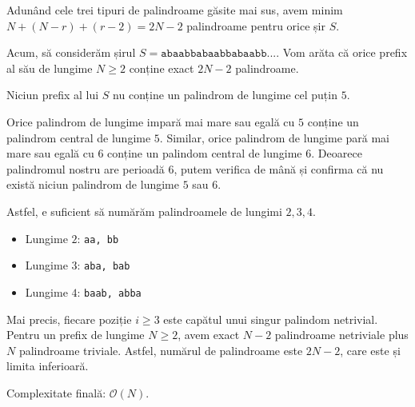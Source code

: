 Adunând cele trei tipuri de palindroame găsite mai sus, avem minim $N + (N - r) + (r - 2) = 2N - 2$ palindroame pentru orice șir $S$.

\medskip

Acum, să considerăm șirul $S = \texttt{abaabbabaabbabaabb...}$. Vom arăta că orice prefix al său de lungime $N \geq 2$ conține exact $2N - 2$ palindroame.

\begin{remark}
    Niciun prefix al lui $S$ nu conține un palindrom de lungime cel puțin $5$.
\end{remark}

Orice palindrom de lungime impară mai mare sau egală cu $5$ conține un palindrom central de lungime $5$. Similar, orice palindrom de lungime pară mai mare sau egală cu $6$ conține un palindom central de lungime $6$. Deoarece palindromul nostru are perioadă $6$, putem verifica de mână și confirma că nu există niciun palindrom de lungime $5$ sau $6$.

Astfel, e suficient să numărăm palindroamele de lungimi $2, 3, 4$.
\begin{itemize}
    \item Lungime $2$: \texttt{aa, bb}
    \item Lungime $3$: \texttt{aba, bab}
    \item Lungime $4$: \texttt{baab, abba}
\end{itemize}

Mai precis, fiecare poziție $i \geq 3$ este capătul unui singur palindom netrivial. Pentru un prefix de lungime $N \geq 2$, avem exact $N - 2$ palindroame netriviale plus $N$ palindroame triviale. Astfel, numărul de palindroame este $2N - 2$, care este și limita inferioară.

\medskip

Complexitate finală: $\mathcal{O}(N)$.
